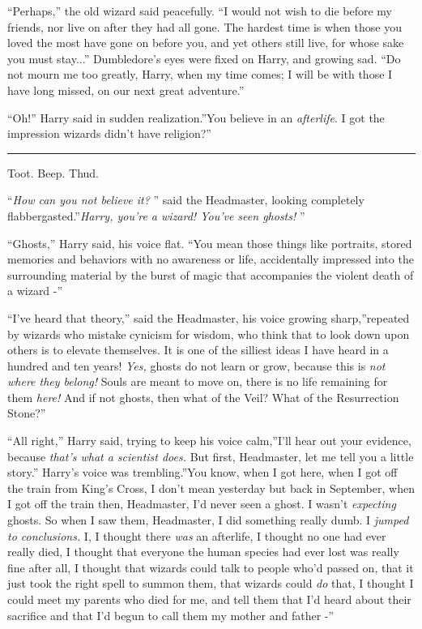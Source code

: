 ``Perhaps,'' the old wizard said peacefully. ``I would not wish to die
before my friends, nor live on after they had all gone. The hardest time
is when those you loved the most have gone on before you, and yet others
still live, for whose sake you must stay...'' Dumbledore's eyes
were fixed on Harry, and growing sad. ``Do not mourn me too greatly,
Harry, when my time comes; I will be with those I have long missed, on
our next great adventure.''

``Oh!'' Harry said in sudden realization.''You believe in an
\emph{afterlife}. I got the impression wizards didn't have religion?''

\begin{center}\rule{3in}{0.4pt}\end{center}

Toot. Beep. Thud.

``\emph{How can you not believe it?} '' said the Headmaster, looking
completely flabbergasted.''\emph{Harry, you're a wizard! You've seen
ghosts!} ''

``Ghosts,'' Harry said, his voice flat. ``You mean those things like
portraits, stored memories and behaviors with no awareness or life,
accidentally impressed into the surrounding material by the burst of
magic that accompanies the violent death of a wizard -''

``I've heard that theory,'' said the Headmaster, his voice growing
sharp,''repeated by wizards who mistake cynicism for wisdom, who think
that to look down upon others is to elevate themselves. It is one of the
silliest ideas I have heard in a hundred and ten years! \emph{Yes,}
ghosts do not learn or grow, because this is \emph{not where they
belong!} Souls are meant to move on, there is no life remaining for them
\emph{here!} And if not ghosts, then what of the Veil? What of the
Resurrection Stone?''

``All right,'' Harry said, trying to keep his voice calm,''I'll hear out
your evidence, because \emph{that's what a scientist does.} But first,
Headmaster, let me tell you a little story.'' Harry's voice was
trembling.''You know, when I got here, when I got off the train from
King's Cross, I don't mean yesterday but back in September, when I got
off the train then, Headmaster, I'd never seen a ghost. I wasn't
\emph{expecting} ghosts. So when I saw them, Headmaster, I did something
really dumb. I \emph{jumped to conclusions.} I, I thought there
\emph{was} an afterlife, I thought no one had ever really died, I
thought that everyone the human species had ever lost was really fine
after all, I thought that wizards could talk to people who'd passed on,
that it just took the right spell to summon them, that wizards could
\emph{do} that, I thought I could meet my parents who died for me, and
tell them that I'd heard about their sacrifice and that I'd begun to
call them my mother and father -''

